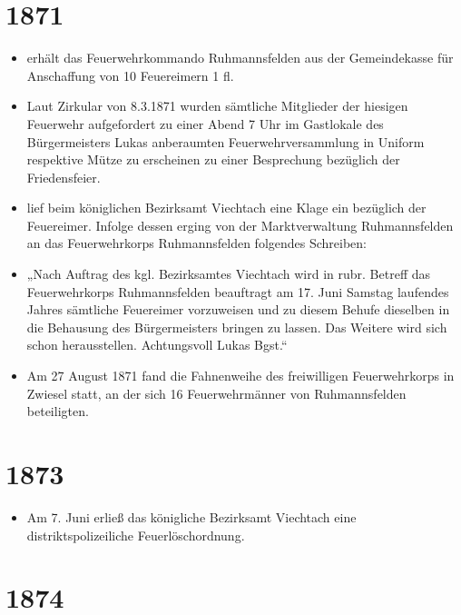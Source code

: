 \documentclass[12pt,a4paper]{book}
\begin{document}
\section*{1871}

\begin{itemize}
\item erhält das Feuerwehrkommando Ruhmannsfelden aus der Gemeindekasse für
Anschaffung von 10 Feuereimern 1 fl.

\item Laut Zirkular von 8.3.1871 wurden sämtliche Mitglieder der hiesigen
Feuerwehr aufgefordert zu einer Abend 7 Uhr im Gastlokale des Bürgermeisters
Lukas anberaumten Feuerwehrversammlung in Uniform respektive Mütze zu erscheinen
zu einer Besprechung bezüglich der Friedensfeier.

\item lief beim königlichen Bezirksamt Viechtach eine Klage ein bezüglich der
Feuereimer. Infolge dessen erging von der Marktverwaltung Ruhmannsfelden an das
Feuerwehrkorps Ruhmannsfelden folgendes Schreiben:

\item „Nach Auftrag des kgl. Bezirksamtes Viechtach wird in rubr. Betreff das
Feuerwehrkorps Ruhmannsfelden beauftragt am 17. Juni Samstag laufendes Jahres
sämtliche Feuereimer vorzuweisen und zu diesem Behufe dieselben in die Behausung
des Bürgermeisters bringen zu lassen. Das Weitere wird sich schon herausstellen.
Achtungsvoll Lukas Bgst.“

\item Am 27 August 1871 fand die Fahnenweihe des freiwilligen Feuerwehrkorps in
Zwiesel statt, an der sich 16 Feuerwehrmänner von Ruhmannsfelden beteiligten.
\end{itemize}

\section*{1873}

\begin{itemize}
\item Am 7. Juni erließ das königliche Bezirksamt Viechtach eine
distriktspolizeiliche Feuerlöschordnung.
\end{itemize}

\section*{1874}
\end{document}
